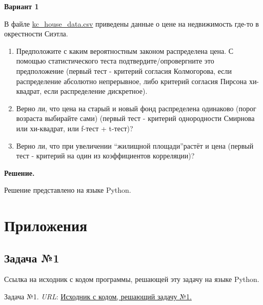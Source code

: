 \documentclass[12pt]{article}
\begin{document}
	\textbf{Вариант 1}
	
	В файле \href{https://drive.google.com/file/d/1cx0pshptDSVmaWLJCBGS9jIIJ2g-VRgT/view}{kc\_house\_data.csv} приведены данные о цене на недвижимость где-то в окрестности Сиэтла.
	
	\begin{enumerate}
		\item Предположите с каким вероятностным законом распределена цена. С помощью статистического теста подтвердите/опровергните это предположение (первый тест - критерий согласия Колмогорова, если распределение абсолютно непрерывное, либо критерий согласия Пирсона хи-квадрат, если распределение дискретное).
		
		\item Верно ли, что цена на старый и новый фонд распределена одинаково (порог возраста выбирайте сами) (первый тест - критерий однородности Смирнова или хи-квадрат, или f-тест + t-тест)?
		
		\item Верно ли, что при увеличении \textquotedblleft жилищной площади\textquotedblright 	растёт и цена (первый тест - критерий на один из коэффициентов корреляции)?
	\end{enumerate}
	
	\textbf{Решение.}
	
	Решение представлено на языке Python.
	\vspace*{1em}
	\newpage
	
	\section*{Приложения}
	
	\subsection*{Задача №1}
	
	Ссылка на исходник с кодом программы, решающей эту задачу на языке Python. \cite{TaskNumber1}
	\newpage
	
	\begin{thebibliography}{99}
		Задача №1. \textit{URL}: \href{https://colab.research.google.com/drive/1ViTlo3eksmFZN0RmQYRjO1QAUtpfM8Ru?usp=sharing}{Исходник с кодом, решающий задачу №1.}
	\end{thebibliography}
	
\end{document}
